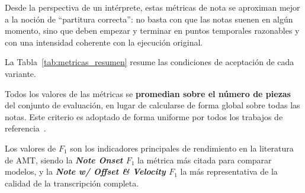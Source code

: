 \documentclass[11pt,spanish,listoffigures,listoftables]{tfgetsinf}
\begin{document}
Desde la perspectiva de un intérprete, estas métricas de nota se aproximan mejor a la noción de “partitura correcta”: no basta con que las notas suenen en algún momento, sino que deben empezar y terminar en puntos temporales razonables y con una intensidad coherente con la ejecución original.

La Tabla~\ref{tab:metricas_resumen} resume las condiciones de aceptación de cada variante.

\begin{table}[h]
  \centering
  \caption[Condiciones de aceptación de un evento predicho como verdadero positivo según
  la variante de métrica de nota empleada]{Condiciones de aceptación de un evento predicho como verdadero positivo según
  la variante de métrica de nota empleada.}
  \label{tab:metricas_resumen}
\end{table}


Todos los valores de las métricas se \textbf{promedian sobre el número de piezas} del conjunto de evaluación, en lugar de calcularse de forma global sobre todas las notas. Este criterio es adoptado de forma uniforme por todos los trabajos de referencia~\cite{hawthorne2018onsetsframes, wang2025mftfilm,yan2024transkun}.

Los valores de $F_1$ son los indicadores principales de rendimiento en la literatura de AMT, siendo la \textbf{\textit{Note Onset} $F_1$} la métrica más citada para comparar modelos, y la \textbf{\textit{Note w/ Offset \& Velocity} $F_1$} la
más representativa de la calidad de la transcripción completa.
\end{document}
